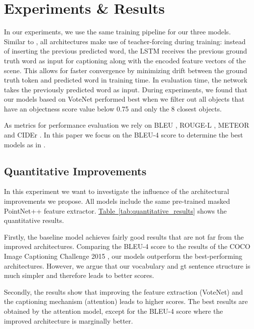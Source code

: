 \documentclass[10pt,twocolumn,letterpaper]{article}
\begin{document}
\section{Experiments \& Results}

In our experiments, we use the same training pipeline for our three models. Similar to \cite{xu2015show}, all architectures make use of teacher-forcing during training: instead of inserting the previous predicted word, the LSTM receives the previous ground truth word as input for captioning along with the encoded feature vectors of the scene. This allows for faster convergence by minimizing drift between the ground truth token and predicted word in training time. In evaluation time, the network takes the previously predicted word as input. During experiments, we found that our models based on VoteNet performed best when we filter out all objects that have an objectness score value below 0.75 and only the 8 closest objects.

As metrics for performance evaluation we rely on BLEU \cite{Papineni2002BleuAM}, ROUGE-L \cite{Lin2004ROUGEAP}, METEOR \cite{Denkowski2014MeteorUL} and CIDEr \cite{DBLP:journals/corr/VedantamZP14a}.  In this paper we focus on the BLEU-4 score to determine the best models as in \cite{xu2015show}. 

\subsection{Quantitative Improvements}
In this experiment we want to investigate the influence of the architectural improvements we propose. All models include the same pre-trained masked PointNet++ feature extractor. 
\hyperref[tab:quantitative_results]{Table~\ref*{tab:quantitative_results}} shows the quantitative results. 

Firstly, the baseline model achieves fairly good results that are not far from the improved architectures. Comparing the BLEU-4 score to the results of the COCO Image Captioning Challenge 2015 \cite{COCO}, our models outperform the best-performing architectures. However, we argue that our vocabulary and gt sentence structure is much simpler and therefore leads to better scores.

Secondly, the results show that improving the feature extraction (VoteNet) and the captioning mechanism (attention) leads to higher scores. The best results are obtained by the attention model, except for the BLEU-4 score where the improved architecture is marginally better.                
\end{document}
